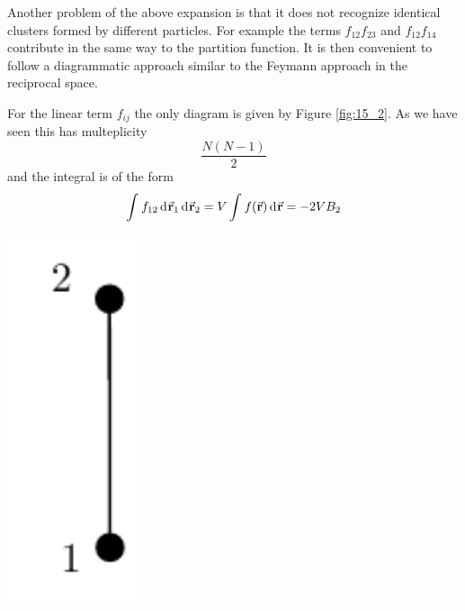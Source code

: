 \documentclass[../main/main.tex]{subfiles}
\begin{document}
Another problem of the above expansion is that it does not recognize identical clusters formed by different particles. For example the terms \( f_{12} f_{23} \) and \( f_{12}f_{14} \) contribute in the same way to the partition function. It is then convenient to follow a diagrammatic approach similar to the Feymann approach in the reciprocal space.

\begin{minipage}[c]{0.7\linewidth}
For the linear term \( f_{ij} \) the only diagram is given by Figure \ref{fig:15_2}. As we have seen this has multeplicity
\begin{equation*}
\frac{N(N-1)}{2}
\end{equation*}
and the integral is of the form
\begin{equation*}
  \int_{}^{}  f_{12} \dd[]{\va{r}_1} \dd[]{\va{r}_2}  = V \int_{}^{} f(\va{r}) \dd[]{\va{r}}  = - 2 V B_2
\end{equation*}
\end{minipage}
\begin{minipage}[]{0.3\linewidth}
\centering
\includegraphics[width=0.3\textwidth]{../lessons/15_image/5.pdf}
\end{minipage}
\end{document}
